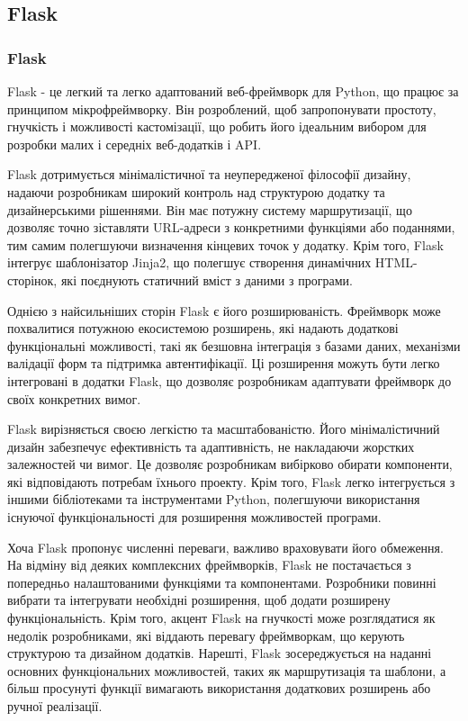 \subsection{Flask}
\label{subsec:flask-subsection}

\subsubsection{Flask}

Flask - це легкий та легко адаптований веб-фреймворк для Python, що працює за принципом мікрофреймворку. Він розроблений, щоб запропонувати простоту, гнучкість і можливості кастомізації, що робить його ідеальним вибором для розробки малих і середніх веб-додатків і API.

Flask дотримується мінімалістичної та неупередженої філософії дизайну, надаючи розробникам широкий контроль над структурою додатку та дизайнерськими рішеннями. Він має потужну систему маршрутизації, що дозволяє точно зіставляти URL-адреси з конкретними функціями або поданнями, тим самим полегшуючи визначення кінцевих точок у додатку. Крім того, Flask інтегрує шаблонізатор Jinja2, що полегшує створення динамічних HTML-сторінок, які поєднують статичний вміст з даними з програми.

Однією з найсильніших сторін Flask є його розширюваність. Фреймворк може похвалитися потужною екосистемою розширень, які надають додаткові функціональні можливості, такі як безшовна інтеграція з базами даних, механізми валідації форм та підтримка автентифікації. Ці розширення можуть бути легко інтегровані в додатки Flask, що дозволяє розробникам адаптувати фреймворк до своїх конкретних вимог.

Flask вирізняється своєю легкістю та масштабованістю. Його мінімалістичний дизайн забезпечує ефективність та адаптивність, не накладаючи жорстких залежностей чи вимог. Це дозволяє розробникам вибірково обирати компоненти, які відповідають потребам їхнього проекту. Крім того, Flask легко інтегрується з іншими бібліотеками та інструментами Python, полегшуючи використання існуючої функціональності для розширення можливостей програми.

Хоча Flask пропонує численні переваги, важливо враховувати його обмеження. На відміну від деяких комплексних фреймворків, Flask не постачається з попередньо налаштованими функціями та компонентами. Розробники повинні вибрати та інтегрувати необхідні розширення, щоб додати розширену функціональність. Крім того, акцент Flask на гнучкості може розглядатися як недолік розробниками, які віддають перевагу фреймворкам, що керують структурою та дизайном додатків. Нарешті, Flask зосереджується на наданні основних функціональних можливостей, таких як маршрутизація та шаблони, а більш просунуті функції вимагають використання додаткових розширень або ручної реалізації.


